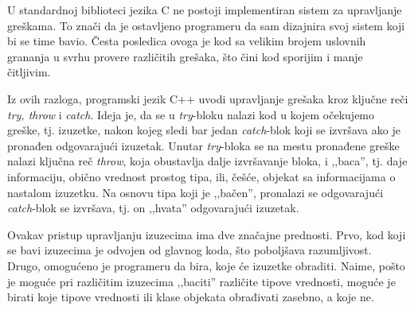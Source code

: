 \documentclass[a4paper]{article}
\begin{document}
{U standardnoj biblioteci jezika C ne postoji implementiran sistem za upravljanje greškama. To znači da je ostavljeno programeru da sam dizajnira svoj sistem koji bi se time bavio. Česta posledica ovoga je kod sa velikim brojem uslovnih grananja u svrhu provere različitih grešaka, što čini kod sporijim i manje čitljivim.

Iz ovih razloga, programski jezik C++ uvodi upravljanje grešaka kroz ključne reči \emph{try, throw} i \emph{catch}. Ideja je, da se u \emph{try}-bloku nalazi kod u kojem očekujemo greške, tj. izuzetke, nakon kojeg sledi bar jedan \emph{catch}-blok koji se izvršava ako je pronađen odgovarajući izuzetak. Unutar \emph{try}-bloka se na mestu pronađene greške nalazi ključna reč \emph{throw}, koja obustavlja dalje izvršavanje bloka, i ,,baca'', tj. daje informaciju, obično vrednost prostog tipa, ili, češće, objekat sa informacijama o nastalom izuzetku. Na osnovu tipa koji je ,,bačen'', pronalazi se odgovarajući \emph{catch}-blok se izvršava, tj. on ,,hvata'' odgovarajući izuzetak.

Ovakav pristup upravljanju izuzecima ima dve značajne prednosti. Prvo, kod koji se bavi izuzecima je odvojen od glavnog koda, što poboljšava razumljivost. Drugo, omogućeno je programeru da bira, koje će izuzetke obraditi. Naime, pošto je moguće pri različitim izuzecima ,,baciti'' različite tipove vrednosti, moguće je birati koje tipove vrednosti ili klase objekata obrađivati zasebno, a koje ne.


}
\end{document}
